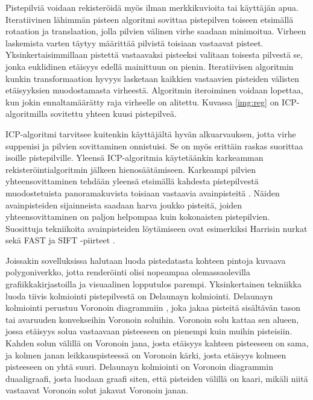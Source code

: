 Pistepilviä voidaan rekisteröidä myös ilman merkkikuvioita tai käyttäjän apua. Iteratiivinen lähimmän pisteen algoritmi  sovittaa pistepilven toiseen etsimällä rotaation ja translaation, jolla pilvien välinen virhe saadaan minimoitua. Virheen laskemista varten täytyy määrittää pilvistä toisiaan vastaavat pisteet. Yksinkertaisimmillaan pistettä vastaavaksi pisteeksi valitaan toisesta pilvestä se, jonka euklidinen etäisyys edellä mainittuun on pienin. Iteratiivisen algoritmin kunkin transformaation hyvyys lasketaan kaikkien vastaavien pisteiden välisten etäisyyksien muodostamasta virheestä. Algoritmin iteroiminen voidaan lopettaa, kun jokin ennaltamäärätty raja virheelle on alitettu. Kuvassa \ref{img:reg} on ICP-algoritmilla sovitettu yhteen kuusi pistepilveä. \cite{icp}


ICP-algoritmi tarvitsee kuitenkin käyttäjältä hyvän alkuarvauksen, jotta virhe suppenisi ja pilvien sovittaminen onnistuisi. Se on myös erittäin raskas suorittaa isoille pistepilville. Yleensä ICP-algoritmia käytetäänkin karkeamman rekisteröintialgoritmin jälkeen hienosäätämiseen. Karkeampi pilvien yhteensovittaminen tehdään yleensä etsimällä kahdesta pistepilvestä muodostetuista panoramakuvista toisiaan vastaavia avainpisteitä . Näiden avainpisteiden sijainneista saadaan harva joukko pisteitä, joiden yhteensovittaminen on paljon helpompaa kuin kokonaisten pistepilvien. Suosittuja tekniikoita avainpisteiden löytämiseen ovat esimerkiksi Harrisin nurkat \cite{harris} sekä FAST ja SIFT -piirteet \cite{fast}\cite{sift}. \cite{weinmann}

Joissakin sovelluksissa halutaan luoda pistedatasta kohteen pintoja kuvaava polygoniverkko, jotta renderöinti olisi nopeampaa olemassaolevilla grafiikkakirjastoilla ja visuaalinen lopputulos parempi. Yksinkertainen tekniikka luoda tiivis kolmiointi pistepilvestä on Delaunayn kolmiointi. Delaunayn kolmiointi perustuu Voronoin diagrammiin , joka jakaa pisteitä sisältävän tason tai avaruuden konvekseihin Voronoin soluihin. Voronoin solu kattaa sen alueen, jossa etäisyys solua vastaavaan pisteeseen on pienempi kuin muihin pisteisiin. Kahden solun välillä on Voronoin jana, josta etäisyys kahteen pisteeseen on sama, ja kolmen janan leikkauspisteessä on Voronoin kärki, josta etäisyys kolmeen pisteeseen on yhtä suuri. Delaunayn kolmiointi on Voronoin diagrammin duaaligraafi, josta luodaan graafi siten, että pisteiden välillä on kaari, mikäli niitä vastaavat Voronoin solut jakavat Voronoin janan. \cite{delaunay}

